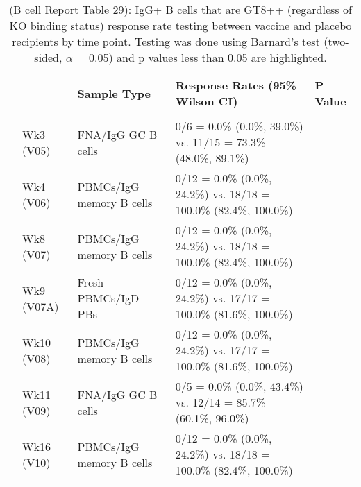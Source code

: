 \documentclass[
]{article}
\author{}
\date{\vspace{-2.5em}}
\begin{document}
\begin{table}[!h]

\caption[(B cell Report Table 29) IgG+ B cells that are GT8++ (regardless of KO binding status) response rate testing between vaccine and placebo recipients by time point]{\label{tab:bcell-tab-29}(B cell Report Table 29): IgG+ B cells that are GT8++ (regardless of KO binding status) response rate testing between vaccine and placebo recipients by time point. Testing was done using Barnard's test (two-sided, $\alpha$ = 0.05) and p values less than 0.05 are highlighted.}
\centering
\fontsize{7.5}{9.5}\selectfont
\begin{tabular}[t]{lllll}
\toprule
 &  & Sample Type & Response Rates (95\% Wilson CI) & P Value\\
\midrule
\addlinespace[0.3em]
\multicolumn{5}{l}{\textbf{Placebo vs. 20µg}}\\
\hspace{1em} & Wk3 (V05) & FNA/IgG GC B cells & 0/6 = 0.0\% (0.0\%, 39.0\%) vs. 11/15 = 73.3\% (48.0\%, 89.1\%) & \cellcolor{yellow}{0.0026}\\
\cmidrule{2-5}
\hspace{1em}\hspace{1em} & Wk4 (V06) & PBMCs/IgG memory B cells & 0/12 = 0.0\% (0.0\%, 24.2\%) vs. 18/18 = 100.0\% (82.4\%, 100.0\%) & \cellcolor{yellow}{<0.0001}\\
\cmidrule{2-5}
\hspace{1em} & Wk8 (V07) & PBMCs/IgG memory B cells & 0/12 = 0.0\% (0.0\%, 24.2\%) vs. 18/18 = 100.0\% (82.4\%, 100.0\%) & \cellcolor{yellow}{<0.0001}\\
\cmidrule{2-5}
\hspace{1em}\hspace{1em} & Wk9 (V07A) & Fresh PBMCs/IgD- PBs & 0/12 = 0.0\% (0.0\%, 24.2\%) vs. 17/17 = 100.0\% (81.6\%, 100.0\%) & \cellcolor{yellow}{<0.0001}\\
\cmidrule{2-5}
\hspace{1em}\hspace{1em} & Wk10 (V08) & PBMCs/IgG memory B cells & 0/12 = 0.0\% (0.0\%, 24.2\%) vs. 17/17 = 100.0\% (81.6\%, 100.0\%) & \cellcolor{yellow}{<0.0001}\\
\cmidrule{2-5}
\hspace{1em} & Wk11 (V09) & FNA/IgG GC B cells & 0/5 = 0.0\% (0.0\%, 43.4\%) vs. 12/14 = 85.7\% (60.1\%, 96.0\%) & \cellcolor{yellow}{0.0006}\\
\cmidrule{2-5}
\hspace{1em} & Wk16 (V10) & PBMCs/IgG memory B cells & 0/12 = 0.0\% (0.0\%, 24.2\%) vs. 18/18 = 100.0\% (82.4\%, 100.0\%) & \cellcolor{yellow}{<0.0001}\\

\end{tabular}
\end{table}
\end{document}
